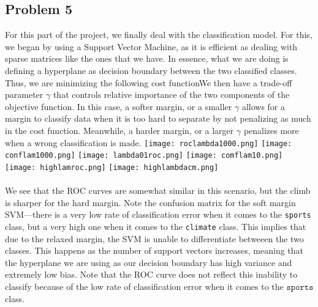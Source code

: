 \documentclass[11pt]{article}
\begin{document}
\begin{multicols}{2}
\subsection*{Problem 5}
For this part of the project, we finally deal with the classification model. For this, we began by using a Support Vector Machine, as it is efficient as dealing with sparse matrices like the ones that we have. In essence, what we are doing is defining a hyperplane as decision boundary between the two classified classes. Thus, we are minimizing the following cost functionWe then have a trade-off parameter $\gamma$ that controls relative importance of the two components of the objective function. In this case, a softer margin, or a smaller $\gamma$ allows for a margin to classify data when it is too hard to separate by not penalizing as much in the cost function. Meanwhile, a harder margin, or a larger $\gamma$ penalizes more when a wrong classification is made. \newline
\texttt{[image: roclambda1000.png]}
\texttt{[image: conflam1000.png]}
\texttt{[image: lambda01roc.png]}
\texttt{[image: comflam10.png]}
\texttt{[image: highlamroc.png]}
\texttt{[image: highlambdacm.png]}
\\\\
We see that the ROC curves are somewhat similar in this scenario, but the climb is sharper for the hard margin. Note the confusion matrix for the soft margin SVM—there is a very low rate of classification error when it comes to the \texttt{sports} class, but a very high one when it comes to the \texttt{climate} class. This implies that due to the relaxed margin, the SVM is unable to differentiate betweeen the two classes. This happens as the number of support vectors increases,  meaning that the hyperplane we are using as our decision boundary has high variance and extremely low bias. Note that the ROC curve does not reflect this inability to classify because of the low rate of classification error when it comes to the $\texttt{sports}$ class.

\end{multicols}
\end{document}
